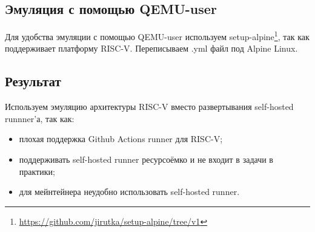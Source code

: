 \subsection{Эмуляция с помощью QEMU-user}
Для удобства эмуляции с помощью QEMU-user используем setup-alpine\footnote{\href{https://github.com/jirutka/setup-alpine/tree/v1}{https://github.com/jirutka/setup-alpine/tree/v1}}, так как поддерживает платформу RISC-V. Переписываем .yml файл под Alpine Linux.
\subsection{Результат}
Используем эмуляцию архитектуры RISC-V вместо развертывания self-hosted runnner'а, так как: 
\begin{itemize}
    \item плохая поддержка Github Actions runner для RISC-V;\
    \item поддерживать self-hosted runner ресурсоёмко и не входит в задачи в практики;
    \item для мейнтейнера неудобно использовать self-hosted runner.
\end{itemize}